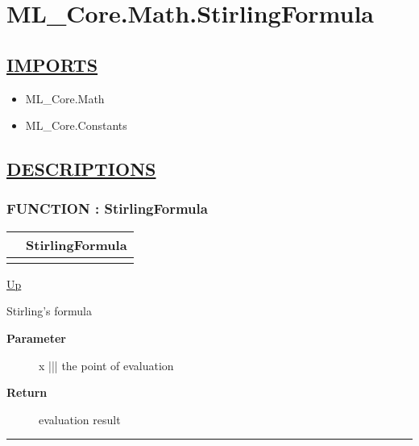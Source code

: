 \chapter*{ML\_Core.Math.StirlingFormula}
\hypertarget{ecldoc:toc:ML_Core.Math.StirlingFormula}{}

\section*{\underline{IMPORTS}}
\begin{itemize}
\item ML\_Core.Math
\item ML\_Core.Constants
\end{itemize}

\section*{\underline{DESCRIPTIONS}}
\subsection*{FUNCTION : StirlingFormula}
\hypertarget{ecldoc:ml_core.math.stirlingformula}{}

{\renewcommand{\arraystretch}{1.5}
\begin{tabularx}{\textwidth}{|>{\raggedright\arraybackslash}l|X|}
\hline
\hspace{0pt} & StirlingFormula \\
\hline
\multicolumn{2}{|>{\raggedright\arraybackslash}X|}{\hspace{0pt}(REAL x)} \\
\hline
\end{tabularx}
}

\hyperlink{ecldoc:toc:ML_Core/Math}{Up}

\par
Stirling's formula

\par
\begin{description}
\item [\textbf{Parameter}] x ||| the point of evaluation
\item [\textbf{Return}] evaluation result
\end{description}

\rule{\textwidth}{0.4pt}

